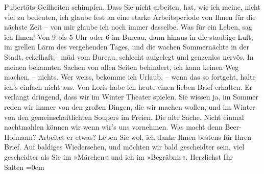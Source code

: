 \begin{ledgroupsized}[t]{13cm}
               Pubertäts-Geilheiten schimpfen.\pend
           \pstart
           Dass Sie nicht arbeiten, hat, wie ich meine, nicht viel zu bedeuten, ich glaube fest
               an eine starke Arbeitsperiode von Ihnen für die nächste Zeit – von mir glaube ich
               noch immer dasselbe.\pend
           \pstart
           Was für ein Leben, sag ich Ihnen! Von 9 bis 5 Uhr oder 6 im Bureau, dann hinaus in
               die staubige Luft, im grellen Lärm des vergehenden Tages, und die wachen Sommernächte
               in der Stadt, eckelhaft;– müd vom Bureau, schlecht aufgelegt und genzenlos
               nervös.\pend
           \pstart
           In meinen bekannten Sachen von {\pb}allen Seiten behindert,
               ich kann keinen Weg machen, – nichts. Wer weiss, bekomme ich Urlaub, – wenn das so
               fortgeht, halte ich’s einfach nicht aus.\pend
           \pstart
           Von Loris habe ich heute einen lieben Brief erhalten.
               Er verlangt dringend, dass wir im Winter Theater spielen. Sie wissen ja, im Sommer
               reden wir immer von den großen Dingen, die wir machen wollen, und im Winter von den
               gemeinschaftlichten Soupers im Freien. Die alte Sache. Nicht einmal nachtmahlen
               können wir wenn wir’s uns vornehmen. Was macht denn Beer-Hofmann? Arbeitet er etwas? \pend
           \pstart
           Leben Sie wol, ich danke Ihnen bestens für Ihren Brief. Auf baldiges Wiedersehen, und
               möchten wir bald gescheidter sein, viel gescheidter als Sie im »Märchen« und ich im »Begräbnis«.\pend
           \pstart
           Herzlichst Ihr{\\[\baselineskip]}\spacefill\mbox{Salten}\pend
           \leftskip=0em{}
         
         \endnumbering{}\end{ledgroupsized}\begin{anhang}\end{anhang}\newcommand{\dateiname}{L03123}\newcommand{\titel}{Felix Salten an Arthur Schnitzler, 6. 7. 1893}\newcommand{\editorInnen}{Martin Anton Müller und Laura Untner}
      